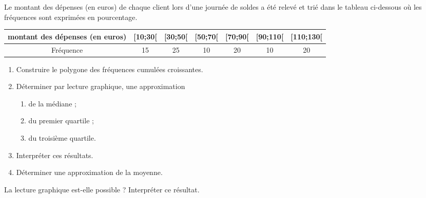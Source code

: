 
Le montant des dépenses (en euros) de chaque client
lors d’une journée de soldes a été relevé et trié dans le
tableau ci-dessous où les fréquences sont exprimées en
pourcentage.

\begin{tabular}{|c|c|c|c|c|c|c|}
\hline 
montant des dépenses (en euros) & [10;30[ & [30;50[ & [50;70[ & [70;90[ & [90;110[ & [110;130[ \\ 
\hline 
Fréquence & 15 & 25 & 10 & 20 & 10 & 20 \\ 
\hline 
\end{tabular} 



\begin{enumerate}
\item Construire le polygone des fréquences cumulées
croissantes.
\item Déterminer par lecture graphique, une approximation
\begin{enumerate}
\item de la médiane ; 
\item du premier quartile ;
\item du troisième quartile.
\end{enumerate}
\item Interpréter ces résultats.
\item Déterminer une approximation de la moyenne.
\end{enumerate}

La lecture graphique est-elle possible ? Interpréter ce résultat.